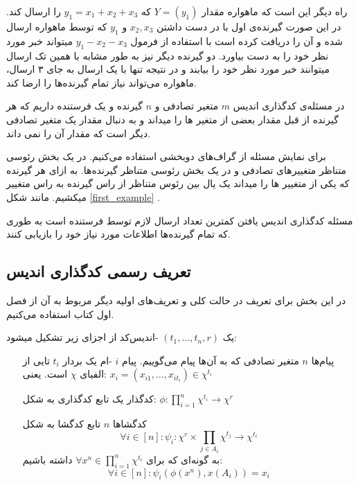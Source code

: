 \noindent
راه دیگر این است که ماهواره مقدار
$Y = (y_1)$
که
$y_1 = x_1 + x_2 + x_3$
را ارسال کند. در این صورت گیرنده‌ی اول با در دست داشتن
$x_2, x_3$
و 
$y_1$
که توسط ماهواره ارسال شده و آن را دریافت کرده است با استفاده از فرمول
$y_1 - x_2 - x_3$
میتواند خبر مورد نظر خود را به دست بیاورد. دو گیرنده دیگر نیز به طور مشابه با همین تک ارسال میتوانند خبر مورد نظر خود را بیابند و در نتیجه تنها با یک ارسال به جای ۳ ارسال، ماهواره می‌تواند نیاز تمام گیرنده‌ها را ارضا کند.

در مسئله‌ی کدگذاری اندیس
$m$
متغیر تصادفی و
$n$
گیرنده و یک فرستنده داریم که هر گیرنده از قبل مقدار بعضی از متغیر ها را میداند و به دنبال مقدار یک متغیر تصادفی دیگر است که مقدار آن را نمی داند.

\noindent
برای نمایش مسئله از گراف‌های دوبخشی استفاده می‌کنیم. در یک بخش رئوسی متناظر متغییرهای تصادفی و در یک بخش رئوسی متناظر گیرنده‌ها. به ازای هر گیرنده که یکی از متغییر ها را میداند یک یال بین رئوس متناظر از راس گیرنده به راس متغییر میکشیم. مانند شکل
\autoref{first_example}
.

مسئله کدگذاری اندیس یافتن کمترین تعداد ارسال لازم توسط فرستنده است به طوری که تمام گیرنده‌ها اطلاعات مورد نیاز خود را بازیابی کنند.
	\subsection{تعریف رسمی کدگذاری اندیس}
در این بخش برای تعریف
\icod
در حالت کلی و تعریف‌های اولیه دیگر مربوط به آن از فصل اول کتاب
\cite{fatemehbook}
استفاده می‌کنیم.
\begin{definition}
	\label{def:icod}
	یک
	$(t_1, \ldots, t_n, r)$
	-اندیس‌کد از اجزای زیر تشکیل میشود:
	\begin{itemize}
		\item [پیام‌ها]
		$n$
		 متغیر تصادفی که به آن‌ها پیام می‌گوییم. پیام
		  $i$
		  -ام یک بردار 
		  $t_i$
		  تایی از الفبای
		  $\chi$
		  است. یعنی:
		  $x_i = (x_{i1}, \ldots, x_{it_i}) \in \chi^{t_i}$
		  \item[
		  کدگذار
		  ]
		   یک تابع کدگذاری به شکل:
		   $\phi: \prod\limits_{i = 1}^n \chi^{t_i}  \rightarrow \chi^r$
		  \item[
		  کدگشاها
		  ]
		  $n$
		  تابع کدگشا به شکل
		  $$\forall i \in [n]: \psi_i: \chi^r \times  \prod\limits_{j \in A_i} \chi^{t_j} \rightarrow \chi^{t_i}$$
		  به گونه‌ای که برای
		  $\forall x^n \in \prod\limits_{i = 1}^{n} \chi^{t_i}$
		  داشته باشیم:
		  $$\forall i \in [n]: \psi_i(\phi(x^n), x(A_i)) = x_i$$
	\end{itemize}
\end{definition}

